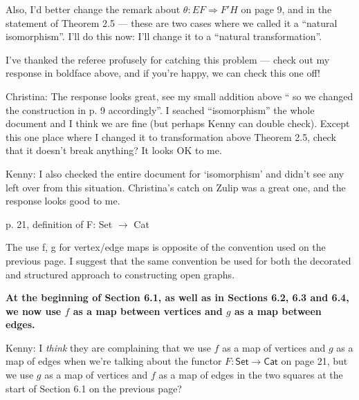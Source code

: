 \documentclass[reqno]{amsart}
\def\chris{\color{purple} Christina: }
\def\kenny{\color{blue} Kenny: }
\begin{document}
\begin{enumerate}
{{Also, I'd better change the remark about  $\theta: EF \Rightarrow F'H$  on page 9, and
 in the statement of Theorem 2.5 --- these are two cases where we called it a ``natural 
isomorphism''.    I'll do this now: I'll change it to a ``natural transformation''.

I've thanked the referee profusely for catching this problem --- check out my response in boldface
above, and if you're happy, we can check this one off!}

{\chris The response looks great, see my small addition above `` so we changed the construction in p. 
9 accordingly''. I seached ``isomorphism'' the whole document and I think we are fine (but perhaps 
Kenny can double check). Except this one place where I changed it to transformation above Theorem 2.5, check that it doesn't break anything? It looks 
OK to me.}

{\kenny I also checked the entire document for `isomorphism' and didn't see any left over from this situation. Christina's catch on Zulip was a great one, and the response looks good to me.}
\fi

\item p. 21, definition of F: Set $\to$ Cat

The use f, g for vertex/edge maps is opposite of the convention used on the previous page. I suggest that the same convention be used for both the 
decorated and structured approach to constructing open graphs.

{\bf At the beginning of Section 6.1, as well as in Sections 6.2, 6.3 and 6.4, we now use $f$ as a map between vertices and $g$ as a map 
between edges.} 





\iffalse
{\kenny I \emph{think} they are complaining that we use $f$ as a map of vertices and $g$ as a map of edges when we're talking about the functor $F \colon \mathsf{Set} \to \mathsf{Cat}$ on page 21, but we use $g$ as a map of vertices and $f$ as a map of edges in the two squares at the start of Section 6.1 on the previous page?}

}
\end{enumerate}
\end{document}
